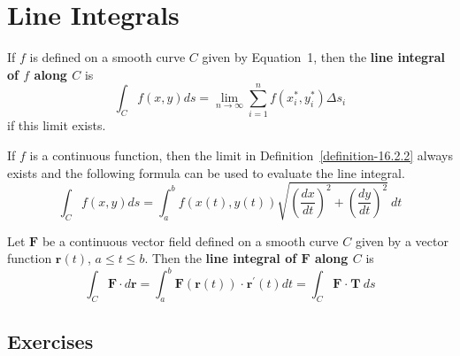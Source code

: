 \section{Line Integrals}
\begin{definition}
	\label{definition-16.2.2}
	If $f$ is defined on a smooth curve $C$ given by Equation~1, then the \textbf{line integral of $f$ along $C$} is
	\begin{equation}
	\int_C f\left(x,y\right)ds = \lim\limits_{n \to \infty} \sum_{i=1}^{n} f\left(x_i^*,y_i^*\right)\Delta s_i
	\end{equation}
	if this limit exists.
\end{definition}
\begin{definition}
	If $f$ is a continuous function, then the limit in Definition~\ref{definition-16.2.2} always exists and the following formula can be used to evaluate the line integral.
	\begin{equation}
	\int_C f\left(x,y\right)ds = \int_a^b f\left(x(t),y(t)\right)\sqrt{\left(\frac{dx}{dt}\right)^2 + \left(\frac{dy}{dt}\right)^2} \ dt
	\end{equation}
\end{definition}
\begin{definition}
	Let $\mathbf{F}$ be a continuous vector field defined on a smooth curve $C$ given by a vector function $\mathbf{r}\left(t\right)$, $a \leq t \leq b$. Then the \textbf{line integral of $\mathbf{F}$ along $C$} is
	\begin{equation}
	\int_C \mathbf{F} \cdot d\mathbf{r} = \int_a^b \mathbf{F}\left(\mathbf{r}\left(t\right)\right) \  \mathbf{\cdot} \  \mathbf{r}^{\prime}\left(t\right) dt = \int_C \mathbf{F} \ \mathbf{\cdot} \ \mathbf{T} \  ds
	\end{equation}
\end{definition}

\subsection{Exercises}


